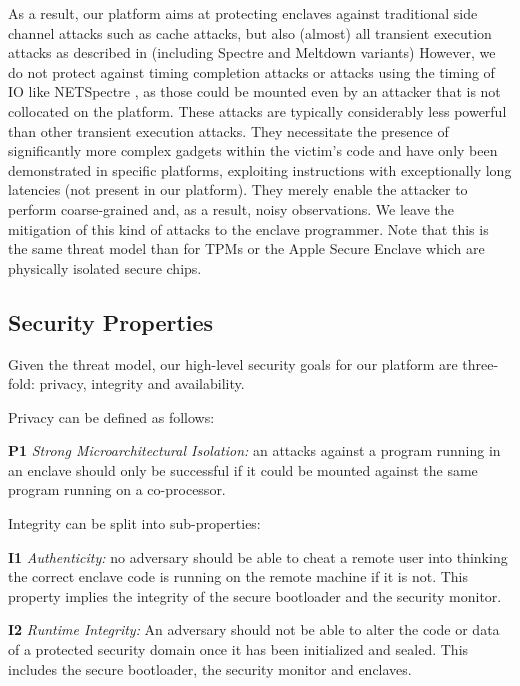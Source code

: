 As a result, our platform aims at protecting enclaves against traditional side channel attacks such as cache attacks, but also (almost) all transient execution attacks as described in \cite{canella2019systematic} (including Spectre \cite{Kocher2018spectre, van2018foreshadow, kiriansky2018speculative, chen2019sgxpectre, koruyeh2018spectre, maisuradze2018ret2spec}  and Meltdown \cite{Lipp2018meltdown, stecklina2018lazyfp, van2018foreshadow} variants) 
However, we do not protect against timing completion attacks or attacks using the timing of IO like NETSpectre \cite{schwarz2019netspectre}, as those could be mounted even by an attacker that is not collocated on the platform.
These attacks are typically considerably less powerful than other transient execution attacks.
They necessitate the presence of significantly more complex gadgets within the victim's code and have only been demonstrated in specific platforms, exploiting instructions with exceptionally long latencies (not present in our platform).
They merely enable the attacker to perform coarse-grained and, as a result, noisy observations.
We leave the mitigation of this kind of attacks to the enclave programmer.
Note that this is the same threat model than for TPMs \cite{moghimi2020tpm} or the Apple Secure Enclave \cite{appleplatformsecurity} which are physically isolated secure chips.

\subsection{Security Properties}
Given the threat model, our high-level security goals for our platform are three-fold: privacy, integrity and availability.

Privacy can be defined as follows:

\noindent\textbf{P1} \emph{Strong Microarchitectural Isolation:} an attacks against a program running in an enclave should only be successful if it could be mounted against the same program running on a co-processor.

Integrity can be split into sub-properties:

\noindent\textbf{I1} \emph{Authenticity:} no adversary should be able to cheat a remote user into thinking the correct enclave code is running on the remote machine if it is not.
This property implies the integrity of the secure bootloader and the security monitor.

\noindent\textbf{I2} \emph{Runtime Integrity:}
An adversary should not be able to alter the code or data  of a protected security domain once it has been initialized and sealed. This includes the secure bootloader, the security monitor and enclaves.

